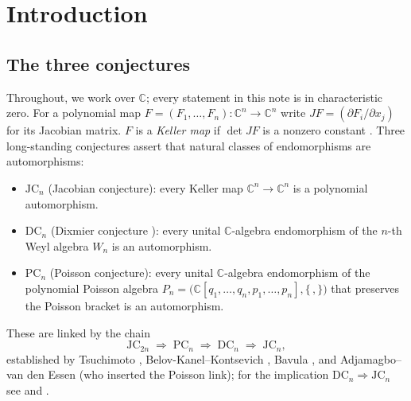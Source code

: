 \documentclass[11pt]{amsart}
\newcommand{\CC}{\mathbb{C}}
\newcommand{\W}{W}
\newcommand{\JC}{\mathrm{JC}}
\newcommand{\DC}{\mathrm{DC}}
\newcommand{\PC}{\mathrm{PC}}
\theoremstyle{plain}
\theoremstyle{definition}
\theoremstyle{remark}
\begin{document}
\section{Introduction}\label{sec:intro}

\subsection{The three conjectures}
Throughout, we work over $\CC$; every statement in this note is in
characteristic zero. For a polynomial map $F=(F_{1},\dots,F_{n})\colon
\CC^{n}\to\CC^{n}$ write $JF=(\partial F_{i}/\partial x_{j})$ for its
Jacobian matrix. $F$ is a \emph{Keller map} if $\det JF$ is a nonzero
constant \cite{Keller39}. Three long-standing conjectures assert that
natural classes of endomorphisms are automorphisms:
\begin{itemize}
\item $\JC_{n}$ (Jacobian conjecture): every Keller map
$\CC^{n}\to\CC^{n}$ is a polynomial automorphism.
\item $\DC_{n}$ (Dixmier conjecture \cite{Dixmier68}): every unital
$\CC$-algebra endomorphism of the $n$-th Weyl algebra $\W_{n}$ is an
automorphism.
\item $\PC_{n}$ (Poisson conjecture): every unital $\CC$-algebra
endomorphism of the polynomial Poisson algebra
$P_{n}=\bigl(\CC[q_{1},\dots,q_{n},p_{1},\dots,p_{n}],\{\,,\}\bigr)$
that preserves the Poisson bracket is an automorphism.
\end{itemize}
These are linked by the chain
\begin{equation}\label{eq:chain}
\JC_{2n}\;\Longrightarrow\;\PC_{n}\;\Longrightarrow\;\DC_{n}
\;\Longrightarrow\;\JC_{n},
\end{equation}
established by Tsuchimoto \cite{Tsuchimoto05}, Belov-Kanel--Kontsevich
\cite{BKK07}, Bavula \cite{Bavula05}, and Adjamagbo--van den Essen
\cite{AvdE07} (who inserted the Poisson link); for the implication
$\DC_{n}\Rightarrow\JC_{n}$ see \cite{vdE00} and \cite[p.~2]{BKK07}.
\end{document}
